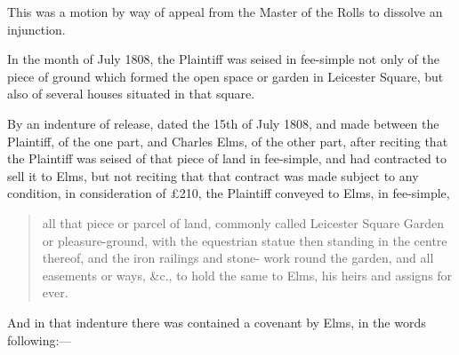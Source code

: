 


This was a motion by way of appeal from the Master of the Rolls to dissolve an
injunction.

In the month of July 1808, the Plaintiff was seised in fee-simple not only of
the piece of ground which formed the open space or garden in Leicester Square,
but also of several houses situated in that square.

By an indenture of release, dated the 15th of July 1808, and made between the
Plaintiff, of the one part, and Charles Elms, of the other part, after reciting
that the Plaintiff was seised of that piece of land in fee-simple, and had
contracted to sell it to Elms, but not reciting that that contract was made
subject to any condition, in consideration of {\pounds}210, the Plaintiff
conveyed to Elms, in fee-simple,
\begin{quote}
all that piece or parcel of land, commonly
called Leicester Square Garden or pleasure-ground, with the equestrian statue
then standing in the centre thereof, and the iron railings and stone- work round
the garden, and all easements or ways, \&c., to hold the same to Elms, his heirs
and assigns for ever.
\end{quote}
And in that indenture there was contained a covenant by
Elms, in the words following:---
